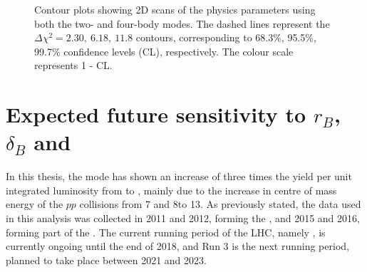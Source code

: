 \begin{figure}[h]
\centering
{}
\caption{Contour plots showing 2D scans of the physics parameters using both the two- and four-body modes. The dashed lines represent the $\Delta \chi^2 = 2.30,\ 6.18,\ 11.8$ contours, corresponding to 68.3\%, 95.5\%, 99.7\% confidence levels (CL), respectively. The colour scale represents 1 - CL.}
\label{gammadiniplotsallmodes}
\end{figure}

\section{Expected future sensitivity to $r_B$, $\delta_B$ and \Pgamma}
\label{sec:interpretation:futuresensitivity}

In this thesis, the \btodkst mode has shown an increase of three times the yield per unit integrated luminosity from \runone to \runtwo, mainly due to the increase in centre of mass energy of the $pp$ collisions from 7 and 8\tev to 13\tev. As previously stated, the data used in this analysis was collected in 2011 and 2012, forming the \runone \dataset, and 2015 and 2016, forming part of the \runtwo \dataset. The current running period of the LHC, namely \runtwo, is currently ongoing until the end of 2018, and Run 3 is the next running period, planned to take place between 2021 and 2023.

